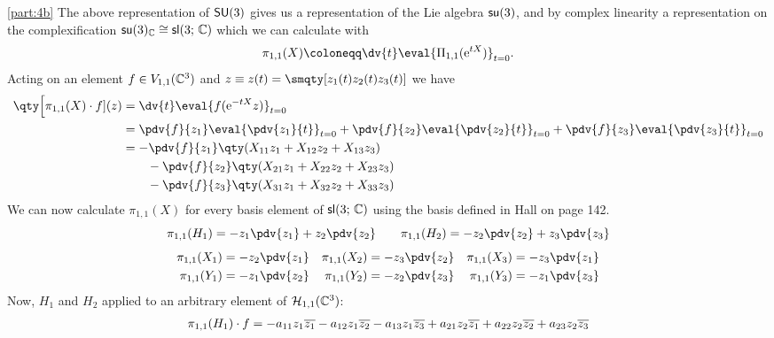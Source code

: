 \documentclass[
	pages,
	boxes,
	color=WildStrawberry
]{homework}
\theoremstyle{plain}
\begin{document}
\begin{solution}
	\ref{part:4b}
	The above representation of $\mathsf{SU}(3)$ gives us a representation of the Lie algebra $\mathsf{su}(3)$, and by complex linearity a representation on the complexification $\mathsf{su}(3)_{\mathbb{C}} \cong \mathsf{sl}(3;\, \mathbb{C})$ which we can calculate with
	\begin{equation*}
		\pi_{1,1}(X) \defeq \dv{t}\eval{\Pi_{1,1}(\e^{tX})}_{t=0}.
	\end{equation*}
	Acting on an element $f\in V_{1,1}(\mathbb{C}^3)$ and $z\equiv z(t) = \smqty[z_1(t) \\ z_2(t) \\ z_3(t)]$ we have
	\begin{align*}
		\qty\Big[\pi_{1,1}(X)\cdot f](z) & = \dv{t}\eval{f(\e^{-tX}z)}_{t=0}                                                                                       \\
		                                 & = \pdv{f}{z_1}\eval{\pdv{z_1}{t}}_{t=0} + \pdv{f}{z_2}\eval{\pdv{z_2}{t}}_{t=0} + \pdv{f}{z_3}\eval{\pdv{z_3}{t}}_{t=0} \\
		                                 & = -\pdv{f}{z_1}\qty(X_{11}z_1 + X_{12}z_2 + X_{13}z_3)                                                                  \\
		                                 & \qquad - \pdv{f}{z_2}\qty(X_{21}z_1 + X_{22}z_2 + X_{23}z_3)                                                            \\
		                                 & \qquad - \pdv{f}{z_3}\qty(X_{31}z_1 + X_{32}z_2 + X_{33}z_3)
	\end{align*}
	We can now calculate $\pi_{1,1}(X)$ for every basis element of $\mathsf{sl}(3;\, \mathbb{C})$ using the basis defined in Hall on page 142.
	\begin{equation*}
		\pi_{1,1}(H_1) = -z_1\pdv{z_1} + z_2\pdv{z_2} \qquad \pi_{1,1}(H_2) = -z_2\pdv{z_2} + z_3\pdv{z_3}      \\
	\end{equation*}
	\begin{align*}
		\pi_{1,1}(X_1) = -z_2\pdv{z_1} &  & \pi_{1,1}(X_2) = -z_3\pdv{z_2} &  & \pi_{1,1}(X_3) = -z_3\pdv{z_1} \\
		\pi_{1,1}(Y_1) = -z_1\pdv{z_2} &  & \pi_{1,1}(Y_2) = -z_2\pdv{z_3} &  & \pi_{1,1}(Y_3) = -z_1\pdv{z_3}
	\end{align*}
	Now, $H_1$ and $H_2$ applied to an arbitrary element of $\mathcal{H}_{1,1}(\mathbb{C}^3)$:
	\begin{align*}
		\pi_{1,1}(H_1)\cdot f & = -a_{11}z_1\conj{z_1} - a_{12}z_1\conj{z_2} - a_{13}z_1\conj{z_3} + a_{21}z_2\conj{z_1} + a_{22}z_2\conj{z_2} + a_{23}z_2\conj{z_3}   \\

\end{align*}
\end{solution}
\end{document}
